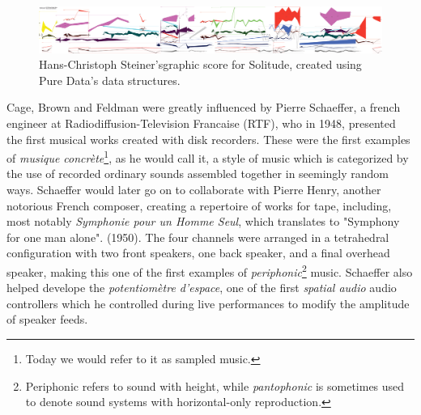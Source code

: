 \begin{figure}[ht!]%
\centering
\includegraphics[width=1.0\textwidth]{img/solitude.png} 
\caption{Hans-Christoph Steiner's\protect\footnotemark graphic score for Solitude, created using Pure Data's data structures. \cite{wikipedia_2020_graphic}}
\end{figure}



Cage, Brown and Feldman were greatly influenced by Pierre Schaeffer, a french engineer at Radiodiffusion-Television Francaise (RTF), who in 1948, presented the first musical works created with disk recorders. These were the first examples of \textit{musique concrète}\footnote{Today we would refer to it as sampled music.}, as he would call it, a style of music which is categorized by the use of recorded ordinary sounds assembled together in seemingly random ways. Schaeffer would later go on to collaborate with Pierre Henry, another notorious French composer, creating a repertoire of works for tape, including, most notably \textit{Symphonie pour un Homme Seul}, which translates to "Symphony for one man alone". (1950). The four channels were arranged in a tetrahedral configuration with two front speakers, one back speaker, and a final overhead speaker, making this one of the first examples of \textit{periphonic}\footnote{Periphonic refers to sound with height, while \textit{pantophonic} is sometimes used to denote sound systems with horizontal-only reproduction.} music. Schaeffer also helped develope the \textit{potentiomètre d'espace}, one of the first \textit{spatial audio} audio controllers which he controlled during live performances to modify the amplitude of speaker feeds. 

